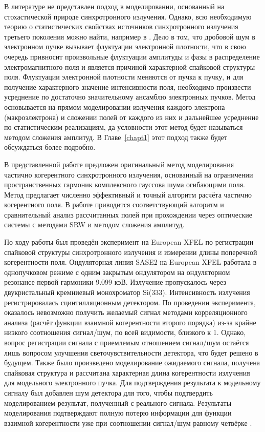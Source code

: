 В литературе не представлен подход в моделировании, основанный на стохастической природе синхротронного излучения. Однако, всю необходимую теорию о статистических свойствах источников синхротронного излучения третьего поколения можно найти, например в \cite{geloni_transverse_2008}. Дело в том, что дробовой шум в электронном пучке вызывает флуктуации электронной плотности, что в свою очередь привносит произвольные флуктуации амплитуды и фазы в распределение электромагнитного поля и является причиной характерной спайковой структуры поля. Флуктуации электронной плотности меняются от пучка к пучку, и для получение характерного значение интенсивности поля, необходимо произвести усреднение по достаточно значительному ансамблю электронных пучков. Метод основывается на прямом моделировании излучения каждого электрона (макроэлектрона) и сложении полей от каждого из них и дальнейшее усреднение по статистическим реализациям, да условности этот метод будет называться методом сложения амплитуд. В Главе~\ref{chapt1} этот подход также будет обсуждаться более подробно.

В представленной работе предложен оригинальный метод моделирования частично когерентного синхротронного излучения, основанный на ограничении пространственных гармоник комплексного гауссова шума огибающими поля. Метод предлагает численно эффективный и точный алгоритм расчёта частично когерентного поля. В работе приводится соответствующий алгоритм и сравнительный анализ рассчитанных полей при прохождении через оптические системы с методами SRW и методом сложения амплитуд. 

По ходу работы был проведён эксперимент на European XFEL по регистрации спайковой структуры синхротронного излучения и измерении длины поперечной когерентности поля. Ондуляторная линия SASE2 на European XFEL работала в однопучковом режиме с одним закрытым ондулятором на ондуляторном резонансе первой гармоники 9.099 кэВ. Излучение пропускалось через двукристальный кремниевый монохроматор Si(333). Интенсивность излучения регистрировалась сцинтилляционным детектором. По проведении эксперимента, оказалось невозможно получить желаемый сигнал методами корреляционного анализа (расчёт функции взаимной когерентности второго порядка) из-за крайне низкого соотношения сигнал/шум, по всей видимости, близкого к 1. Однако, вопрос регистрации сигнала с приемлемым отношением сигнал/шум остаётся лишь вопросом улучшения светочувствительности детектора, что будет решено в будущем. Также было произведено моделирование ожидаемого сигнала, получена спайковая структура и рассчитана характерная длина когерентности излучения для модельного электронного пучка. Для подтверждения результата к модельному сигналу был добавлен шум детектора для того, чтобы подтвердить моделированием результат, полученный с реального сигнала. Результаты моделирования подтверждают полную потерю информации для функции взаимной когерентности уже при соотношении сигнал/шум равному четвёрке .


